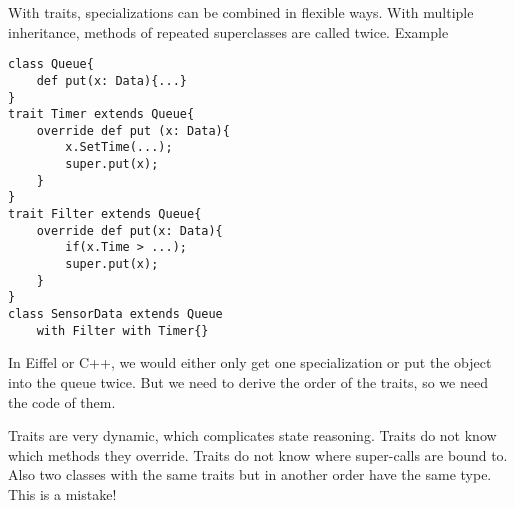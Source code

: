 \begin{mytitle} With traits, specializations can be combined in flexible ways. With multiple inheritance, methods of repeated superclasses are called twice. Example
\begin{minipage}{0.5\textwidth}
\lstset{language=Scala}
\begin{lstlisting}
class Queue{
    def put(x: Data){...}
}
trait Timer extends Queue{
    override def put (x: Data){
        x.SetTime(...);
        super.put(x);
    }
}
trait Filter extends Queue{
    override def put(x: Data){
        if(x.Time > ...);
        super.put(x);
    }
}
class SensorData extends Queue 
    with Filter with Timer{}
\end{lstlisting}
\end{minipage}
\begin{minipage}{0.5\textwidth}
\end{minipage}
In Eiffel or C++, we would either only get one specialization or put the object into the queue twice. But we need to derive the order of the traits, so we need the code of them. 
\end{mytitle}
\begin{mytitle} Traits are very dynamic, which complicates state reasoning. Traits do not know which methods they override. Traits do not know where super-calls are bound to. Also two classes with the same traits but in another order have the same type. This is a mistake!
\end{mytitle}